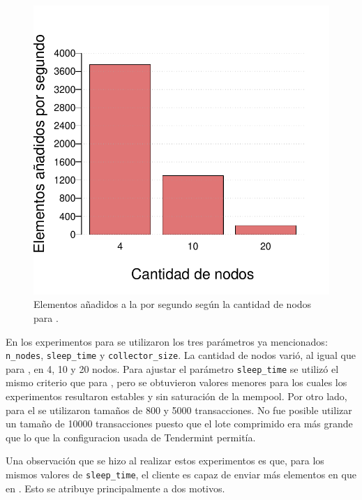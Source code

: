 \subsection{\compresschain}

\begin{figure}
	\centering
	\includegraphics[scale=0.5]{figures/compresschain_results.pdf}
	\caption{Elementos añadidos a la \setchain por segundo según la cantidad de nodos para \compresschain.}
	\label{fig:compresschain_results}
\end{figure}

En los experimentos para \compresschain se utilizaron los tres parámetros ya mencionados: \texttt{n\_nodes},
\texttt{sleep\_time} y \texttt{collector\_size}.
La cantidad de nodos varió, al igual que para \vanilla, en 4, 10 y 20 nodos.
Para ajustar el parámetro \texttt{sleep\_time} se utilizó el mismo criterio que para \vanilla, pero se obtuvieron valores 
menores para los cuales los experimentos resultaron estables y sin saturación de la mempool.
Por otro lado, para el \collector se utilizaron tamaños de 800 y 5000 transacciones.
No fue posible utilizar un tamaño de 10000 transacciones puesto que el lote comprimido era más grande
que lo que la configuracion usada de Tendermint permitía. 

Una observación que se hizo al realizar estos experimentos es que, para los mismos valores de \texttt{sleep\_time},
el cliente es capaz de enviar más elementos en \compresschain que en \vanilla.
Esto se atribuye principalmente a dos motivos.

